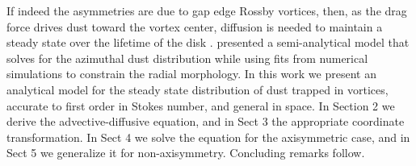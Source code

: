 \documentclass[apj]{emulateapj}
\begin{document}
If indeed the asymmetries are due to gap edge Rossby vortices, then, 
as the drag force drives dust toward the vortex center, diffusion is
needed to maintain a steady state over the lifetime of the disk
\citep{Chavanis00}. \citet{Birnstiel13} presented a semi-analytical model that solves for the azimuthal dust 
distribution while using fits from numerical simulations
\citep{Pinilla12} to constrain the radial morphology. In this work we present an analytical 
model for the steady state distribution of dust trapped in vortices, 
accurate to first order in Stokes number, and general in space. In 
Section 2 we derive the
advective-diffusive equation, and in Sect 3 the appropriate coordinate
transformation. In Sect 4 we solve the equation for the axisymmetric
case, and in Sect 5 we generalize it for non-axisymmetry. Concluding
remarks follow. 










\end{document}
